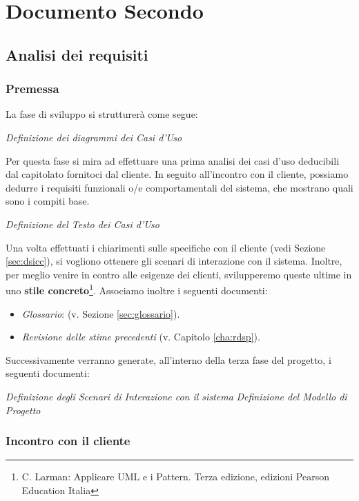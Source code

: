 \part{Documento Secondo}
\chapter{Analisi dei requisiti}\label{cha:pds}
\minitoc\mtcskip
\section{Premessa}
La fase di sviluppo si strutturerà come segue:
\begin{itemize}
\diam \textit{Definizione dei diagrammi dei Casi d'Uso}

Per questa fase si mira ad effettuare una prima analisi dei casi d'uso deducibili
dal capitolato fornitoci dal cliente. In seguito all'incontro con il cliente, possiamo dedurre
i requisiti funzionali o/e comportamentali del sistema, che mostrano quali
sono i compiti base.

\diam \textit{Definizione del Testo dei Casi d'Uso}

Una volta effettuati i chiarimenti sulle specifiche con il cliente (vedi 
Sezione \vref{sec:dsicc}), si vogliono ottenere gli scenari di 
interazione con il sistema. Inoltre, per meglio venire in contro alle esigenze
dei clienti, svilupperemo queste ultime in uno \textbf{stile concreto}\footnote{C. Larman: 
Applicare UML e i Pattern. Terza edizione, edizioni Pearson Education Italia}.
Associamo inoltre i seguenti documenti:
	\begin{itemize}
	\item \textit{Glossario}:
	(v. Sezione \vref{sec:glossario}).
	\item \textit{Revisione delle stime precedenti} (v. Capitolo \vref{cha:rdsp}).
	\end{itemize}

\end{itemize}

Successivamente verranno generate, all'interno della terza fase del progetto, 
i seguenti documenti:
\begin{itemize}
\diam \textit{Definizione degli Scenari di Interazione con il sistema} %
\diam \textit{Definizione del Modello di Progetto} %
\end{itemize}

\section{Incontro con il cliente}\label{sec:dsicc}
